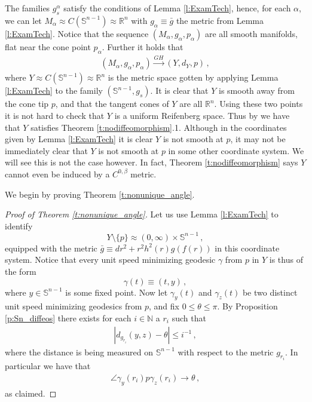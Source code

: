 \documentclass[11pt]{article}
\newcommand{\NN}{\mathds{N}}
\newcommand{\RR}{\mathds{R}}
\newcommand{\Sn}{\mathds{S}}
\begin{document}
The families $g^\alpha_s$ satisfy the conditions of Lemma \ref{l:ExamTech}, hence, for each $\alpha$, we can let $M_\alpha\approx C(\Sn^{n-1})\approx \RR^n$ with $g_\alpha \equiv \bar g$ the metric from Lemma \ref{l:ExamTech}.  Notice that the sequence $(M_\alpha,g_\alpha,p_\alpha)$ are all smooth manifolds, flat near the cone point $p_\alpha$.  Further it holds that
\begin{align}
(M_\alpha,g_\alpha,p_\alpha)\stackrel{GH}{\rightarrow} (Y,d_Y,p)\, ,
\end{align}
where $Y\approx C(\Sn^{n-1})\approx \RR^n$ is the metric space gotten by applying Lemma \ref{l:ExamTech} to the family $(\Sn^{n-1},g_s)$.  It is clear that $Y$ is smooth away from the cone tip $p$, and that the tangent cones of $Y$ are all $\RR^n$.  Using these two points it is not hard to check that $Y$ is a uniform Reifenberg space.  Thus by \cite{ChC2} we have that $Y$ satisfies Theorem \ref{t:nodiffeomorphism}.1.  Although in the coordinates given by Lemma \ref{l:ExamTech} it is clear $Y$ is not smooth at $p$, it may not be immediately clear that $Y$ is not smooth at $p$ in some other coordinate system.  We will see this is not the case however.  In fact, Theorem \ref{t:nodiffeomorphism} says $Y$ cannot even be induced by a $C^{0,\beta}$ metric.

We begin by proving Theorem \ref{t:nonunique_angle}.

\begin{proof}[Proof of Theorem \ref{t:nonunique_angle}]
 Let us use Lemma \ref{l:ExamTech} to identify
$$Y\setminus\{p\}\approx (0,\infty)\times\Sn^{n-1}\, ,$$
equipped with the metric $\bar g\equiv dr^2+r^2h^2(r) g(f(r))$ in this coordinate system.  Notice that every unit speed minimizing geodesic $\gamma$ from $p$ in $Y$ is thus of the form
$$\gamma(t)\equiv (t,y)\, ,$$
where $y\in \Sn^{n-1}$ is some fixed point.  Now let $\gamma_y(t)$ and $\gamma_z(t)$ be two distinct unit speed minimizing geodesics from $p$, and fix $0\leq\theta\leq\pi$.  By Proposition \ref{p:Sn_diffeos} there exists for each $i\in\NN$ a $r_i$ such that
\begin{align}
 |d_{g_{r_i}}(y,z)-\theta|\leq i^{-1}\, ,
\end{align}
where the distance is being measured on $\Sn^{n-1}$ with respect to the metric $g_{r_i}$.  In particular we have that
\begin{align}
 \angle\gamma_y(r_i)p\gamma_z(r_i)\rightarrow \theta\, ,
\end{align}
as claimed.
\end{proof}
\end{document}
